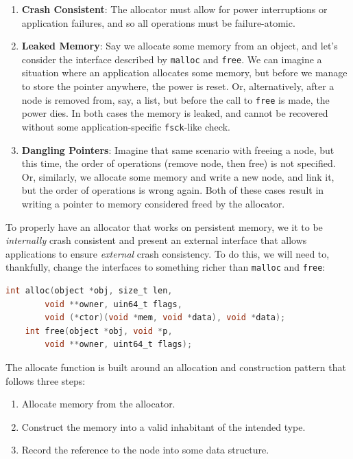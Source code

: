 \begin{enumerate}
    \item \textbf{Crash Consistent}: The allocator must allow for power interruptions or application failures, and so
          all operations must be failure-atomic.
    \item \textbf{Leaked Memory}: Say we allocate some memory from an object, and let's consider the interface described
          by \texttt{malloc} and \texttt{free}. We can imagine a situation where an application allocates some memory, but
          before we manage to store the pointer anywhere, the power is reset. Or, alternatively, after a node is removed from,
          say, a list, but before the call to \texttt{free} is made, the power dies. In both cases the memory is leaked, and
          cannot be recovered without some application-specific \texttt{fsck}-like check.
    \item \textbf{Dangling Pointers}: Imagine that same scenario with freeing a node, but this time, the order of operations
          (remove node, then free) is not specified. Or, similarly, we allocate some memory and write a new node, and link it, but the order of operations is
          wrong again. Both of these cases result in writing a pointer to memory considered freed by the allocator.
\end{enumerate}

To properly have an allocator that works on persistent memory, we it to be \emph{internally} crash consistent and
present an external interface that allows applications to ensure \emph{external} crash consistency. To do this, we will
need to, thankfully, change the interfaces to something richer than \texttt{malloc} and \texttt{free}:

\begin{lstlisting}[language=C]
    int alloc(object *obj, size_t len,
        void **owner, uin64_t flags,
        void (*ctor)(void *mem, void *data), void *data);
    int free(object *obj, void *p,
        void **owner, uint64_t flags);
\end{lstlisting}

The allocate function is built around an allocation and construction pattern that follows three steps:
\begin{enumerate}
    \item Allocate memory from the allocator.
    \item Construct the memory into a valid inhabitant of the intended type.
    \item Record the reference to the node into some data structure.
\end{enumerate}

